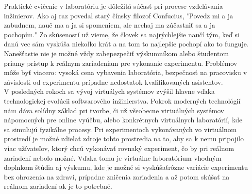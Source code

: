 \indent Praktické cvičenie v laboratóriu je dôležitá súčasť pri procese vzdelávania inžinierov. Ako aj raz povedal starý čínsky filozof Confucius, "Povedz mi a ja zabudnem, nauč ma a ja si spomeniem, ale nechaj ma zúčastniť sa a ja pochopím." Zo skúseností už vieme, že človek sa najrýchlejšie naučí tým, keď si danú vec sám vyskúša niekoľko krát a na tom to najlepšie pochopí ako to funguje. Nanešťastie nie je možné vždy zabepezpečiť výskumníkom alebo študentom priamy prístup k reálnym zariadeniam pre vykonanie experimentu. Problémov môže byť viacero: vysoká cena vybavenia laboratória, bezpečnosť na pracovisku v závislosti od experimentu prípadne nedostatok kvalifikovaných asistentov.\\
\indent V posledných rokoch sa vývoj virtuálych systémov zvýšil hlavne vďaka technologickej evolúcii softwarového inžinierstva. Pokrok moderných technológií nám dáva solídny základ pri tvorbe, či už všeobecne virtuálných systémov nápomocných pre online vyúčbu, alebo konkrétnych virtuálnych laboratórií, kde sa simulujú fyzikálne procesy. Pri experimentoch vykonávaných vo virtuálnom prostredí je možné zdielať zdroje tohto prostredia na to, aby sa k nemu pripojilo viac užívateľov, ktorý chcú vykonávať rovnaký experiment, čo by pri reálnom zariadení nebolo možné. Vďaka tomu je virtuálne laboratórium vhodným doplnkom štúdia aj výskumu, kde je možné si vyskúšaťrôzne variácie experimentu bez ohrozenia na zdraví, prípadne zničenia zariadenia a až potom skúšať na reálnom zariadení ak je to potrebné.\\